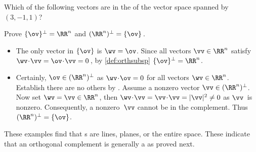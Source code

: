 \begin{reduce}
\begin{activity}
Which of the following vectors are in the  of the vector space spanned by~\((3,-1,1)\)?
\end{activity}



\begin{example} 
Prove \(\{\ov\}^\perp=\RR^n\) and \((\RR^n)^\perp=\{\ov\}\)\,.
\begin{solution} 
\begin{itemize}
\item The only vector in \(\{\ov\}\) is \(\wv=\ov\).
Since all vectors \(\vv\in\RR^n\) satisfy \(\wv\cdot\vv=\ov\cdot\vv=0\)\,, by \autoref{def:orthsubsp} \(\{\ov\}^\perp=\RR^n\).

\item Certainly, \(\ov\in(\RR^n)^\perp\) as \(\wv\cdot\ov=0\) for all vectors \(\wv\in\RR^n\).
Establish there are no others by .
Assume a nonzero vector \(\vv\in(\RR^n)^\perp\).
Now set \(\wv=\vv\in\RR^n\), then \(\wv\cdot\vv=\vv\cdot\vv=|\vv|^2\neq0\) as \(\vv\)~is nonzero.
Consequently, a nonzero~\(\vv\) cannot be in the complement.
Thus \((\RR^n)^\perp=\{\ov\}\).
\end{itemize}
\end{solution}
\end{example}




%
%
%

These examples find that s are lines, planes, or the entire space.  
These indicate that an orthogonal complement is generally a  as proved next.


\end{reduce}
